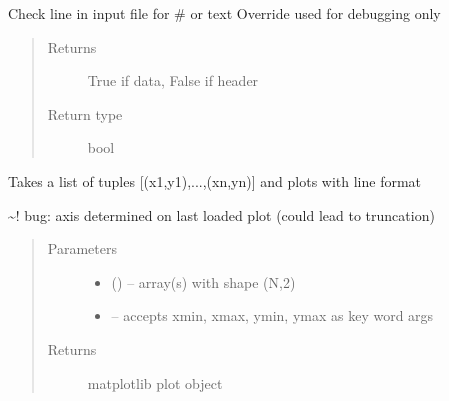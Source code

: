 \documentclass[letterpaper,10pt,english]{sphinxmanual}
\begin{document}
\begin{fulllineitems}
\label{\detokenize{rst/utilities:mstack.utilities.not_header}}
Check line in input file for \# or text
Override used for debugging only
\begin{quote}\begin{description}
\item[{Returns}] \leavevmode
True if data, False if header

\item[{Return type}] \leavevmode
bool

\end{description}\end{quote}

\end{fulllineitems}


\begin{fulllineitems}
\label{\detokenize{rst/utilities:mstack.utilities.plot}}
Takes a list of tuples {[}(x1,y1),...,(xn,yn){]} and plots with line format

\textasciitilde{}! bug: axis determined on last loaded plot (could lead to truncation)
\begin{quote}\begin{description}
\item[{Parameters}] \leavevmode\begin{itemize}
\item {} 
 (\sphinxstyleliteralemphasis{, }) -- array(s) with shape (N,2)

\item {} 
 -- accepts xmin, xmax, ymin, ymax as key word args

\end{itemize}

\item[{Returns}] \leavevmode
matplotlib plot object

\end{description}\end{quote}

\end{fulllineitems}
\end{document}
